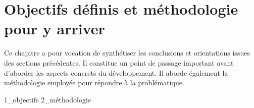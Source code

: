 \section{Objectifs définis et méthodologie pour y arriver}

Ce chapitre a pour vocation de synthétiser les conclusions et orientations issues des sections précédentes. 
Il constitue un point de passage important avant d’aborder les aspects concrets du développement.
Il aborde également la méthodologie employée pour répondre à la problématique.

{1_objectifs}
{2_méthodologie}

